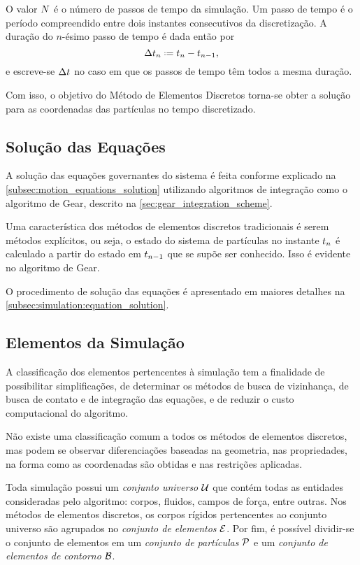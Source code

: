 O valor \(N\) é o número de passos de tempo da simulação. Um passo de tempo é o período compreendido entre dois instantes consecutivos da discretização. A duração do \(n\)-ésimo passo de tempo é dada então por
\begin{equation*}
	\Dt[n] \eqdef \instant[n] - \instant[n-1],
\end{equation*}
e escreve-se \(\Dt\) no caso em que os passos de tempo têm todos a mesma duração.

Com isso, o objetivo do Método de Elementos Discretos torna-se obter a solução para as coordenadas das partículas no tempo discretizado.

\subsection{Solução das Equações}

A solução das equações governantes do sistema é feita conforme explicado na \cref{subsec:motion_equations_solution} utilizando algoritmos de integração como o algoritmo de Gear, descrito na \cref{sec:gear_integration_scheme}.

Uma característica dos métodos de elementos discretos tradicionais é serem métodos explícitos, ou seja, o estado do sistema de partículas no instante \(\instant[n]\) é calculado a partir do estado em \(\instant[n-1]\) que se supõe ser conhecido. Isso é evidente no algoritmo de Gear.

O procedimento de solução das equações é apresentado em maiores detalhes na \cref{subsec:simulation:equation_solution}.

\subsection{Elementos da Simulação}

A classificação dos elementos pertencentes à simulação tem a finalidade de possibilitar simplificações, de determinar os métodos de busca de vizinhança, de busca de contato e de integração das equações, e de reduzir o custo computacional do algoritmo.

Não existe uma classificação comum a todos os métodos de elementos discretos, mas podem se observar diferenciações baseadas na geometria, nas propriedades, na forma como as coordenadas são obtidas e nas restrições aplicadas. 

Toda simulação possui um \textit{conjunto universo} \(\mathcal{U}\) que contém todas as entidades consideradas pelo algoritmo: corpos, fluidos, campos de força, entre outras. Nos métodos de elementos discretos, os corpos rígidos pertencentes ao conjunto universo são agrupados no \textit{conjunto de elementos} \(\mathcal{E}\). Por fim, é possível dividir-se o conjunto de elementos em um \textit{conjunto de partículas} \(\mathcal{P}\) e um \textit{conjunto de elementos de contorno} \(\mathcal{B}\).

